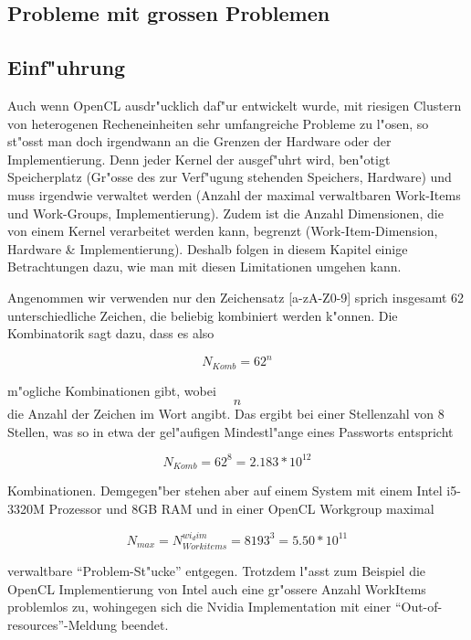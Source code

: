 \begin{refsection}
\section{Probleme mit grossen Problemen}

\subsection{Einf"uhrung}

Auch wenn OpenCL ausdr"ucklich daf"ur entwickelt wurde, mit riesigen Clustern
von heterogenen Recheneinheiten sehr umfangreiche Probleme zu l"osen, so st"osst
man doch irgendwann an die Grenzen der Hardware oder der Implementierung.  Denn
jeder Kernel der ausgef"uhrt wird, ben"otigt Speicherplatz (Gr"osse des zur
Verf"ugung stehenden Speichers, Hardware) und muss irgendwie verwaltet werden
(Anzahl der maximal verwaltbaren Work-Items und Work-Groups, Implementierung).
Zudem ist die Anzahl Dimensionen, die von einem Kernel verarbeitet werden kann,
begrenzt (Work-Item-Dimension, Hardware \& Implementierung). Deshalb folgen in
diesem Kapitel einige Betrachtungen dazu, wie man mit diesen Limitationen
umgehen kann.

Angenommen wir verwenden nur den Zeichensatz [a-zA-Z0-9] sprich insgesamt 62 
unterschiedliche Zeichen, die beliebig kombiniert werden k"onnen. Die 
Kombinatorik sagt dazu, dass es also

\[
 N_{Komb} =  62^{n}
\]

m"ogliche Kombinationen gibt,  wobei \[n\] die Anzahl der Zeichen im Wort angibt. 
Das ergibt bei einer Stellenzahl von 8 Stellen, was so in etwa der gel"aufigen 
Mindestl"ange eines Passworts entspricht 

\[ 
 N_{Komb} = 62^{8} = 2.183 * 10^12 
\] 

Kombinationen. Demgegen"ber stehen aber auf einem System mit einem Intel i5-3320M 
Prozessor und 8GB RAM und in einer OpenCL Workgroup maximal

\[
 N_{max} = N_{Workitems}^{wi_dim} = 8193^{3} = 5.50 * 10^11
\]

verwaltbare ``Problem-St"ucke'' entgegen. Trotzdem l"asst zum Beispiel die OpenCL
Implementierung von Intel auch eine gr"ossere Anzahl WorkItems problemlos zu, 
wohingegen sich die Nvidia Implementation mit einer ``Out-of-resources''-Meldung 
beendet.


\end{refsection}
